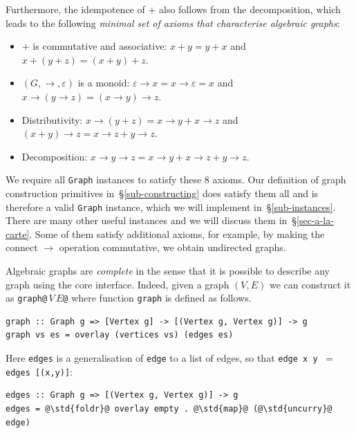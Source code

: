 \documentclass[acmlarge,anonymous]{acmart}\settopmatter{printfolios=true}
\newcommand{\hs}{\texttt}
\newcommand{\std}[1]{{\color[rgb]{0,0.3,0} #1}}
\begin{document}
\noindent
Furthermore, the idempotence of $+$ also follows from the decomposition, which
leads to the following \emph{minimal set of axioms that characterise algebraic graphs}:

\begin{itemize}
    \item $+$ is commutative and associative: $x + y = y + x$ and
    $x + (y + z) = (x + y) + z$.
    \item $(G, \rightarrow, \varepsilon)$ is a monoid:
    $\varepsilon \rightarrow x = x \rightarrow \varepsilon = x$ and
    $x \rightarrow (y \rightarrow z) = (x \rightarrow y) \rightarrow z$.
    \item Distributivity:
    $x \rightarrow (y + z) = x \rightarrow y + x \rightarrow z$ and
    $(x + y) \rightarrow z = x \rightarrow z + y \rightarrow z$.
    \item Decomposition: $x \rightarrow y \rightarrow z =
    x \rightarrow y + x \rightarrow z + y \rightarrow z$.
\end{itemize}

We require all \hs{Graph} instances to satisfy these 8 axioms. Our definition
of graph construction primitives in~\S\ref{sub-constructing} does satisfy them
all and is therefore a valid \hs{Graph} instance, which we will implement
in~\S\ref{sub-instances}. There are many other useful instances and we will discuss
them in~\S\ref{sec-a-la-carte}. Some of them satisfy additional
axioms, for example, by making the connect $\rightarrow$ operation commutative,
we obtain undirected graphs.

Algebraic graphs are \emph{complete} in the sense that it is possible to describe
any graph using the core interface. Indeed, given a graph $(V,E)$ we can construct
it as \hs{graph@$\,V\,E$@} where function \hs{graph} is defined as follows.

\begin{verbatim}
graph :: Graph g => [Vertex g] -> [(Vertex g, Vertex g)] -> g
graph vs es = overlay (vertices vs) (edges es)
\end{verbatim}

Here \hs{edges} is a generalisation of \hs{edge} to a list of edges, so that
\hs{edge x y} $\ =\ $ \hs{edges [(x,y)]}:

\begin{verbatim}
edges :: Graph g => [(Vertex g, Vertex g)] -> g
edges = @\std{foldr}@ overlay empty . @\std{map}@ (@\std{uncurry}@ edge)
\end{verbatim}
\end{document}
